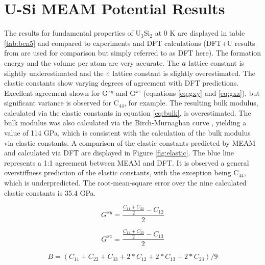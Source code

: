 \documentclass[review]{elsarticle}
\begin{document}
\clearpage

\section{U-Si MEAM Potential Results}

The results for fundamental properties of U$_{3}$Si$_{2}$ at 0 K are displayed in table \ref{tab:ben5} and compared to experiments \cite{zachariasen1949, berche2009} and DFT calculations \cite{noordhoek2016} (DFT+U results from \cite{noordhoek2016} are used for comparison but simply referred to as DFT here).  The formation energy and the volume per atom are very accurate.  The $\it{a}$ lattice constant is slightly underestimated and the $\it{c}$ lattice constant is slightly overestimated.  The elastic constants show varying degrees of agreement with DFT predictions.  Excellent agreement shown for G$^{xy}$ and G$^{xz}$ (equations \ref{eq:gxy} and \ref{eq:gxz}), but significant variance is observed for C$_{44}$, for example.  The resulting bulk modulus, calculated via the elastic constants in equation \ref{eq:bulk}, is overestimated.  The bulk modulus was also calculated via the Birch-Murnaghan curve \cite{cohen85, birch47}, yielding a value of 114 GPa, which is consistent with the calculation of the bulk modulus via elastic constants.  A comparison of the elastic constants predicted by MEAM and calculated via DFT are displayed in Figure \ref{fig:elastic}.  The blue line represents a 1:1 agreement between MEAM and DFT.  It is observed a general overstiffness prediction of the elastic constants, with the exception being C$_{44}$, which is underpredicted.  The root-mean-square error over the nine calculated elastic constants is 35.4 GPa.  

\begin{equation}
\label{eq:gxy}
G^{xy}= \frac{\frac{C_{11} + C_{22}}{2} - C_{12}}{2}
\end{equation}

\begin{equation}
\label{eq:gxz}
G^{xz}= \frac{\frac{C_{11} + C_{33}}{2} - C_{13}}{2}
\end{equation}

\begin{equation}
\label{eq:bulk}
B=(C_{11} + C_{22} + C_{33} + 2*C_{12} + 2*C_{13} + 2*C_{23})/9
\end{equation}
\end{document}
